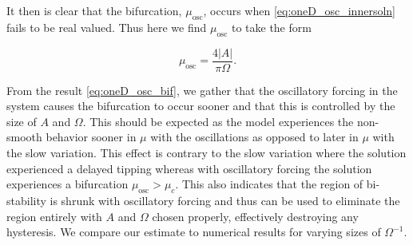 It then is clear that the bifurcation, $\mu_{\text{osc}}$, occurs when \eqref{eq:oneD_osc_innersoln} fails to be real valued. Thus here we find $\mu_{\text{osc}}$ to take the form

\begin{equation}\label{eq:oneD_osc_bif}
\mu_{\text{osc}}=\frac{4|A|}{\pi \Omega}.
\end{equation}

From the result \eqref{eq:oneD_osc_bif}, we gather that the oscillatory forcing in the system causes the bifurcation to occur sooner and that this is controlled by the size of $A$ and $\Omega$. This should be expected as the model experiences the non-smooth behavior sooner in $\mu$ with the oscillations as opposed to later in $\mu$ with the slow variation. This effect is contrary to the slow variation where the solution experienced a delayed tipping whereas with oscillatory forcing the solution experiences a bifurcation $\mu_{\text{osc}}>\mu_c$. This also indicates that the region of bi-stability is shrunk with oscillatory forcing and thus can be used to eliminate the region entirely with $A$ and $\Omega$ chosen properly, effectively destroying any hysteresis. We compare our estimate to numerical results for varying sizes of $\Omega^{-1}$.

